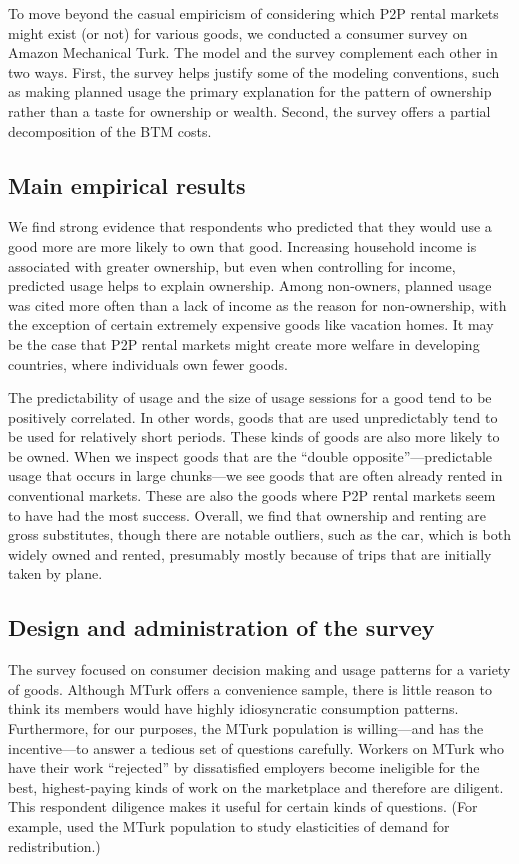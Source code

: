 \documentclass[11pt]{article}
\begin{document}
To move beyond the casual empiricism of considering which P2P rental markets might exist (or not) for various goods, we conducted a consumer survey on Amazon Mechanical Turk. 
The model and the survey complement each other in two ways. 
First, the survey helps justify some of the modeling conventions, such as making planned usage the primary explanation for the pattern of ownership rather than a taste for ownership or wealth. 
Second, the survey offers a partial decomposition of the BTM costs. 

\subsection{Main empirical results}
We find strong evidence that respondents who predicted that they would use a good more are more likely to own that good.
Increasing household income is associated with greater ownership, but even when controlling for income, predicted usage helps to explain ownership. 
Among non-owners, planned usage was cited more often than a lack of income as the reason for non-ownership, with the exception of certain extremely expensive goods like vacation homes.
It may be the case that P2P rental markets might create more welfare in developing countries, where individuals own fewer goods. 

The predictability of usage and the size of usage sessions for a good tend to be positively correlated.
In other words, goods that are used unpredictably tend to be used for relatively short periods.
These kinds of goods are also more likely to be owned. 
When we inspect goods that are the ``double opposite''---predictable usage that occurs in large chunks---we see goods that are often already rented in conventional markets.
These are also the goods where P2P rental markets seem to have had the most success.
Overall, we find that ownership and renting are gross substitutes, though there are notable outliers, such as the car, which is both widely owned and rented, presumably mostly because of trips that are initially taken by plane. 

\subsection{Design and administration of the survey}
The survey focused on consumer decision making and usage patterns for a variety of goods. 
Although MTurk offers a convenience sample, there is little reason to think its members would have highly idiosyncratic consumption patterns. 
Furthermore, for our purposes, the MTurk population is willing---and has the incentive---to answer a tedious set of questions carefully.
Workers on MTurk who have their work ``rejected'' by dissatisfied employers become ineligible for the best, highest-paying kinds of work on the marketplace and therefore are diligent. 
This respondent diligence makes it useful for certain kinds of questions.
(For example, \cite{kuziemko2013elastic} used the MTurk population to study elasticities of demand for redistribution.)
\end{document}
